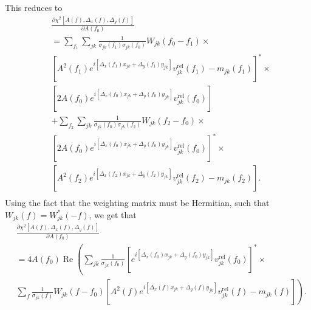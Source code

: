 \documentclass{article}
\newcommand\re{\operatorname{Re}}
\begin{document}
This reduces to
\begin{equation}
\begin{split}
    &\frac{\partial \chi^2[A(f), \Delta_x(f), \Delta_y(f)]}{\partial A(f_0)} \\
    & = \sum_{f_1} \sum_{jk} \frac{1}{\sigma_{jk}(f_1)\sigma_{jk}(f_0)} W_{jk}(f_0-f_1) \times \\
    & \left[ A^2(f_1) e^{i[\Delta_x(f_1) x_{jk} + \Delta_y(f_1) y_{jk}]} v^\text{rel}_{jk}(f_1) - m_{jk}(f_1) \right]^* \times \\
    & \left[ 2 A(f_0) e^{i[\Delta_x(f_0) x_{jk} + \Delta_y(f_0) y_{jk}]} v^\text{rel}_{jk}(f_0) \right] \\
    & + \sum_{f_2} \sum_{jk} \frac{1}{\sigma_{jk}(f_0)\sigma_{jk}(f_2)} W_{jk}(f_2-f_0) \times \\
    & \left[ 2 A(f_0) e^{i[\Delta_x(f_0) x_{jk} + \Delta_y(f_0) y_{jk}]} v^\text{rel}_{jk}(f_0) \right]^* \times \\
    & \left[ A^2(f_2) e^{i[\Delta_x(f_2) x_{jk} + \Delta_y(f_2) y_{jk}]} v^\text{rel}_{jk}(f_2) - m_{jk}(f_2) \right]. \\
\end{split}
\end{equation}
Using the fact that the weighting matrix must be Hermitian, such that $W_{jk}(f) = W^*_{jk}(-f)$, we get that
\begin{equation}
\begin{split}
    &\frac{\partial \chi^2[A(f), \Delta_x(f), \Delta_y(f)]}{\partial A(f_0)} \\
    & = 4 A(f_0) \re \left( \sum_{jk} \frac{1}{\sigma_{jk}(f_0)} \left[ e^{i[\Delta_x(f_0) x_{jk} + \Delta_y(f_0) y_{jk}]} v^\text{rel}_{jk}(f_0) \right]^* \times \right. \\
    & \left. \sum_{f} \frac{1}{\sigma_{jk}(f)} W_{jk}(f-f_0) \left[ A^2(f) e^{i[\Delta_x(f) x_{jk} + \Delta_y(f) y_{jk}]} v^\text{rel}_{jk}(f) - m_{jk}(f) \right] \right) . \\
\end{split}
\end{equation}
\end{document}
